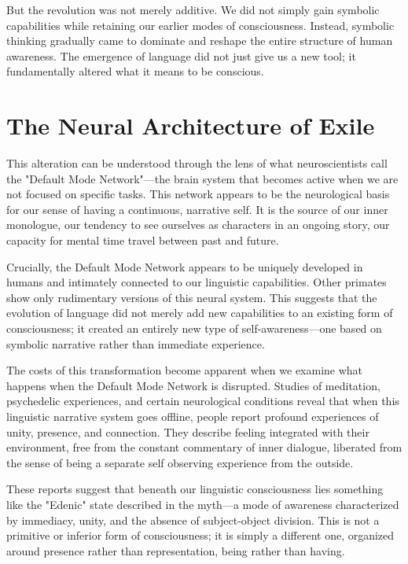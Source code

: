 But the revolution was not merely additive. We did not simply gain symbolic capabilities while retaining our earlier modes of consciousness. Instead, symbolic thinking gradually came to dominate and reshape the entire structure of human awareness. The emergence of language did not just give us a new tool; it fundamentally altered what it means to be conscious.

\section{The Neural Architecture of Exile}

This alteration can be understood through the lens of what neuroscientists call the "Default Mode Network"—the brain system that becomes active when we are not focused on specific tasks. This network appears to be the neurological basis for our sense of having a continuous, narrative self. It is the source of our inner monologue, our tendency to see ourselves as characters in an ongoing story, our capacity for mental time travel between past and future.

Crucially, the Default Mode Network appears to be uniquely developed in humans and intimately connected to our linguistic capabilities. Other primates show only rudimentary versions of this neural system. This suggests that the evolution of language did not merely add new capabilities to an existing form of consciousness; it created an entirely new type of self-awareness—one based on symbolic narrative rather than immediate experience.

The costs of this transformation become apparent when we examine what happens when the Default Mode Network is disrupted. Studies of meditation, psychedelic experiences, and certain neurological conditions reveal that when this linguistic narrative system goes offline, people report profound experiences of unity, presence, and connection. They describe feeling integrated with their environment, free from the constant commentary of inner dialogue, liberated from the sense of being a separate self observing experience from the outside.

These reports suggest that beneath our linguistic consciousness lies something like the "Edenic" state described in the myth—a mode of awareness characterized by immediacy, unity, and the absence of subject-object division. This is not a primitive or inferior form of consciousness; it is simply a different one, organized around presence rather than representation, being rather than having.

